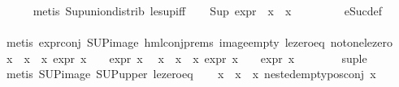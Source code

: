 \begin{isabellebody}
\ \ \ \ \isamarkupfalse%
\ {\isacharparenleft}{\kern0pt}metis\ Sup{\isacharunderscore}{\kern0pt}union{\isacharunderscore}{\kern0pt}distrib\ le{\isacharunderscore}{\kern0pt}sup{\isacharunderscore}{\kern0pt}iff{\isacharparenright}{\kern0pt}{\isacharplus}{\kern0pt}\isanewline
\ \ \isamarkupfalse%
\ {\isachardoublequoteopen}Sup\ {\isacharparenleft}{\kern0pt}{\isacharparenleft}{\kern0pt}expr{\isacharunderscore}{\kern0pt}{}\ {\isasymcirc}\ x{}{\isacharparenright}{\kern0pt}\ {\isacharbackquote}{\kern0pt}\ x{}{\isacharparenright}{\kern0pt}\ {\isasymle}\ {}{\isachardoublequoteclose}\ \isanewline
\ \ \ \ \isamarkupfalse%
\ eSuc{\isacharunderscore}{\kern0pt}def\ \isanewline
\ \ \ \ \isamarkupfalse%
\ {\isacharparenleft}{\kern0pt}metis\ expr{\isacharunderscore}{\kern0pt}{}{\isacharunderscore}{\kern0pt}conj\ SUP{\isacharunderscore}{\kern0pt}image\ hml{\isacharunderscore}{\kern0pt}conj{\isachardot}{\kern0pt}prems{\isacharparenleft}{\kern0pt}{}{\isacharparenright}{\kern0pt}\ image{\isacharunderscore}{\kern0pt}empty\ le{\isacharunderscore}{\kern0pt}zero{\isacharunderscore}{\kern0pt}eq\ not{\isacharunderscore}{\kern0pt}one{\isacharunderscore}{\kern0pt}le{\isacharunderscore}{\kern0pt}zero{\isacharparenright}{\kern0pt}\isanewline
\ \ \isamarkupfalse%
\ {\isachardoublequoteopen}{\isasymforall}x\ {\isasymin}\ x{}\ {\isacharbackquote}{\kern0pt}\ x{}{\isachardot}{\kern0pt}\ expr{\isacharunderscore}{\kern0pt}{}\ x\ {\isasymle}\ {}\ {\isasymand}\ expr{\isacharunderscore}{\kern0pt}{}\ x\ {\isasymle}\ {}{\isachardoublequoteclose}\isanewline
{\isachardoublequoteopen}{\isasymforall}x\ {\isasymin}\ x{}\ {\isacharbackquote}{\kern0pt}\ x{}{\isachardot}{\kern0pt}\ expr{\isacharunderscore}{\kern0pt}{}\ x\ {\isasymle}\ {}\ {\isasymand}\ expr{\isacharunderscore}{\kern0pt}{}\ x\ {\isasymle}\ {}{\isachardoublequoteclose}\isanewline
\ \ \ \ \isamarkupfalse%
\ sup{\isacharunderscore}{\kern0pt}le\isanewline
\ \ \ \ \isamarkupfalse%
\ {\isacharparenleft}{\kern0pt}metis\ SUP{\isacharunderscore}{\kern0pt}image\ SUP{\isacharunderscore}{\kern0pt}upper\ le{\isacharunderscore}{\kern0pt}zero{\isacharunderscore}{\kern0pt}eq{\isacharparenright}{\kern0pt}{\isacharplus}{\kern0pt}\isanewline
\ \ \isamarkupfalse%
\ {\isachardoublequoteopen}{\isasymforall}x\ {\isasymin}\ x{}\ {\isacharbackquote}{\kern0pt}\ x{}{\isachardot}{\kern0pt}\ nested{\isacharunderscore}{\kern0pt}empty{\isacharunderscore}{\kern0pt}pos{\isacharunderscore}{\kern0pt}conj\ x{\isachardoublequoteclose}\isanewline

\end{isabellebody}
